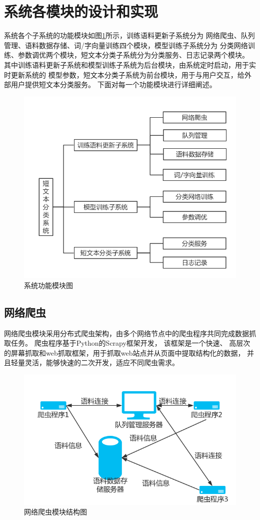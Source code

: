 \section{系统各模块的设计和实现}
系统各个子系统的功能模块如图\ref{system_module}所示，训练语料更新子系统分为
网络爬虫、队列管理、语料数据存储、词/字向量训练四个模块，模型训练子系统分为
分类网络训练、参数调优两个模块，短文本分类子系统分为分类服务、日志记录两个模块。
其中训练语料更新子系统和模型训练子系统为后台模块，由系统定时启动，用于实时更新系统的
模型参数，短文本分类子系统为前台模块，用于与用户交互，给外部用户提供短文本分类服务。
下面对每一个功能模块进行详细阐述。
\begin{figure}[h]
    \includegraphics[scale=0.45]{picture/system_module.png}
    \caption{系统功能模块图}
    \label{system_module}
\end{figure}
\subsection{网络爬虫}
网络爬虫模块采用分布式爬虫架构，由多个网络节点中的爬虫程序共同完成数据抓取任务。
爬虫程序基于Python的Scrapy框架开发，
该框架是一个快速、
高层次的屏幕抓取和web抓取框架，用于抓取web站点并从页面中提取结构化的数据，
并且轻量灵活，能够快速的二次开发，适应不同爬虫需求。
\begin{figure}[h]
    \includegraphics[scale=0.5]{picture/spider.png}
    \caption{网络爬虫模块结构图}
    \label{spider}
\end{figure}

